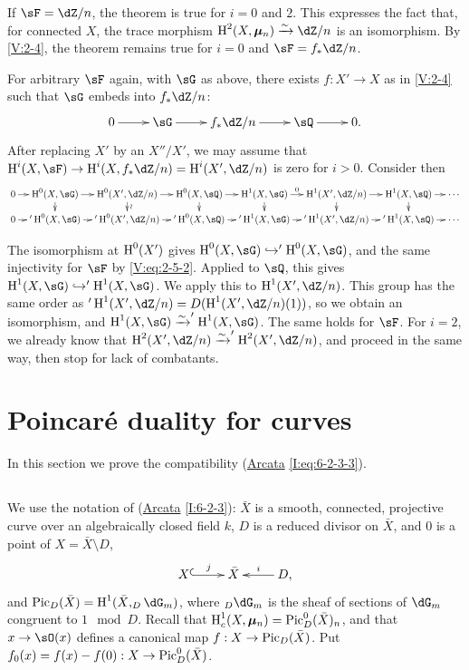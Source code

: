 If $\sF=\dZ/n$, the theorem is true for $i=0$ and $2$. This expresses the
fact that, for connected $X$, the trace morphism
$\h^2(X,\dmu_n) \iso \dZ/n$ is an isomorphism. By \ref{V:2-4}, the theorem
remains true for $i=0$ and $\sF=f_\ast\dZ/n$.

For arbitrary $\sF$ again, with $\sG$ as above, there exists
$f:X'\to X$ as in \ref{V:2-4} such that $\sG$ embeds into
$f_\ast\dZ/n$:
\[\xymatrix{
  0 \ar[r]
    & \sG \ar[r]
    & f_\ast\dZ/n \ar[r]
    & \sQ \ar[r]
    & 0 \text{.}
}\]
After replacing $X'$ by an $X''/X'$, we may assume that
$\h^i(X,\sF) \to \h^i(X,f_\ast\dZ/n) = \h^i(X',\dZ/n)$ is zero for $i>0$.
Consider then
\small
\[\xymatrix@=.3cm{
  0 \ar[r]
    & \h^0(X,\sG) \ar[r] \ar[d]
    & \h^0(X',\dZ/n) \ar[r] \ar[d]^-\wr
    & \h^0(X,\sQ) \ar[r] \ar[d]
    & \h^1(X,\sG) \ar[r]^-0 \ar[d]
    & \h^1(X',\dZ/n) \ar[r] \ar[d]
    & \h^1(X,\sQ) \ar[r] \ar[d]
    & \cdots \\
  0 \ar[r]
    & '\h^0(X,\sG) \ar[r]
    & '\h^0(X',\dZ/n) \ar[r]
    & '\h^0(X,\sQ) \ar[r]
    & '\h^1(X,\sG) \ar[r]
    & '\h^1(X',\dZ/n) \ar[r]
    & '\h^1(X,\sQ) \ar[r]
    & \cdots
}\]
\normalsize

The isomorphism at $\operatorname{H}^0(X')$ gives
$\h^0(X,\sG)\hookrightarrow '\h^0(X,\sG)$, and the same injectivity for
$\sF$ by \eqref{V:eq:2-5-2}. Applied to $\sQ$, this gives
$\h^1(X,\sG)\hookrightarrow '\h^1(X,\sG)$. We apply this to
$\h^1(X',\dZ/n)$. This group has the same order as
$'\h^1(X',\dZ/n)=D(\h^1(X',\dZ/n)(1))$, so we obtain an isomorphism, and
$\h^1(X,\sG) \iso '\h^1(X,\sG)$. The same holds for $\sF$. For $i=2$, we
already know that $\h^2(X',\dZ/n) \iso '\h^2(X',\dZ/n)$, and proceed in the
same way, then stop for lack of combatants.


\section{Poincaré duality for curves}\label{V:3}

In this section we prove the compatibility
(\hyperref[I]{Arcata} \ref{I:eq:6-2-3-3}).


\subsection{}\label{V:3-1}

We use the notation of (\hyperref[I]{Arcata} \ref{I:6-2-3}): $\bar X$ is a
smooth, connected, projective curve over an algebraically closed field $k$,
$D$ is a reduced divisor on $\bar X$, and $0$ is a point of
$X=\bar X\setminus D$,
\[\xymatrix{
  X \ar@{^{(}->}[r]^-j
    & \bar X
    & \ar[l]_-i D \text{,}
}\]
and $\pic_D(\bar X)=\h^1(\bar X,_D\dG_m)$, where $_D\dG_m$ is the sheaf of
sections of $\dG_m$ congruent to $1\mod D$. Recall that
$\operatorname{H}_c^1(X,{\bm\mu}_n) = \operatorname{Pic}_D^0(\bar X)_n$, and that $x\to \sO(x)$ defines a
canonical map $f:X\to \operatorname{Pic}_D(\bar X)$. Put
$f_0(x)=f(x)-f(0):X\to \operatorname{Pic}_D^0(\bar X)$.

